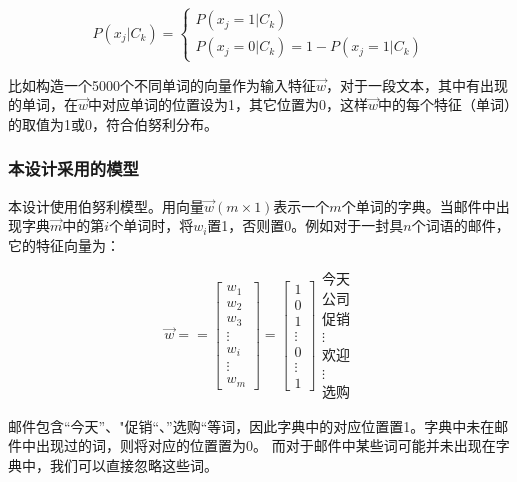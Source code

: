 \documentclass[UTF8,zihao=-4]{ctexart}
\begin{document}
	\begin{equation}
P\left(x_{j} | C_{k}\right)=\left\{\begin{array}{l}{P\left(x_{j}=1 | C_{k}\right)} \\ {P\left(x_{j}=0 | C_{k}\right)=1-P\left(x_{j}=1 | C_{k}\right)}\end{array}\right.
	\end{equation}

比如构造一个5000个不同单词的向量作为输入特征$\vec{w}$，对于一段文本，其中有出现的单词，在$\vec{w}$中对应单词的位置设为1，其它位置为0，这样$\vec{w}$中的每个特征（单词）的取值为1或0，符合伯努利分布。
\subsubsection{本设计采用的模型}
	本设计使用伯努利模型。用向量$\vec{w}(m \times 1)$表示一个$m$个单词的字典。当邮件中出现字典$\vec{m}$中的第$i$个单词时，将$w_i$置1，否则置0。例如对于一封具$n$个词语的邮件，它的特征向量为：
	
	$$
	\vec{w}=
	=
	\begin{bmatrix}
	w_1\\
	w_2\\
	w_3\\
	\vdots\\
	w_i\\
	\vdots\\
	w_m
	\end{bmatrix}
	=
	\begin{bmatrix}
	1\\
	0\\
	1\\
	\vdots\\
	0\\
	\vdots\\
	1
	\end{bmatrix}
	\begin{matrix}
	\text{今天}\\
	\text{公司}\\
	\text{促销}\\
	\vdots\\
	\text{欢迎}\\
	\vdots\\
	\text{选购}
	\end{matrix}
	$$
	
	邮件包含“今天”、"促销“、”选购“等词，因此字典中的对应位置置1。字典中未在邮件中出现过的词，则将对应的位置置为0。 而对于邮件中某些词可能并未出现在字典中，我们可以直接忽略这些词。
	

\newpage
\end{document}

